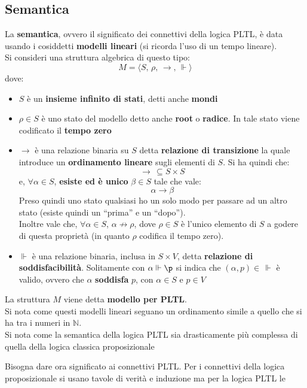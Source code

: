\documentclass[a4paper,12pt, oneside]{book}
\begin{document}
\subsection{Semantica}
\begin{definizione}
  La \textbf{semantica}, ovvero il significato dei connettivi della logica PLTL,
  è data usando i cosiddetti \textbf{modelli lineari} (si ricorda l'uso di un
  tempo lineare).\\
  Si consideri una struttura algebrica di questo tipo:
  \[M=\langle S,\,\rho, \,\to, \,\Vdash\rangle\]
  dove:
  \begin{itemize}
    \item $S$ è un \textbf{insieme infinito di stati}, detti anche
    \textbf{mondi}
    \item $\rho \in S$ è uno stato del modello detto anche \textbf{root} o
    \textbf{radice}. In tale stato viene codificato il \textbf{tempo zero}
    \item $\to$ è una relazione binaria su $S$ detta \textbf{relazione di
      transizione} la quale introduce un \textbf{ordinamento lineare} sugli
    elementi di $S$. Si ha quindi che:
    \[\to\,\subseteq S\times S\]
    e, $\forall \alpha \in S$, \textbf{esiste ed è unico} $\beta\in S$ tale che
    vale:
    \[\alpha\to\beta\]
    Preso quindi uno stato qualsiasi ho un solo modo per passare ad un altro
    stato (esiste quindi un ``prima'' e un ``dopo'').\\
    Inoltre vale che, $\forall \alpha\in S$, $\alpha\not\to \rho$, dove $\rho\in
    S$ è l'unico elemento di $S$ a godere di questa proprietà (in quanto $\rho$
    codifica il tempo zero). 
    \item $\Vdash$ è una relazione binaria, inclusa in $S\times V$, detta
    \textbf{relazione di soddisfacibilità}. Solitamente con $\alpha\Vdash\p$
    si indica che $(\alpha,p)\in\,\Vdash$ è valido, ovvero che $\alpha$
    \textbf{soddisfa} $p$, con $\alpha\in S$ e $p\in V$
  \end{itemize}
  La struttura $M$ viene detta \textbf{modello per PLTL}.\\
  Si nota come questi modelli lineari seguano un ordinamento simile a quello che
  si ha tra i numeri in $\mathbb{N}$.\\ 
  Si nota come la semantica della logica PLTL sia drasticamente più complessa
  di quella della logica classica proposizionale 
\end{definizione}
\newpage
Bisogna dare ora significato ai connettivi PLTL. Per i connettivi della logica
proposizionale si usano tavole di verità e induzione ma per la logica PLTL le
\end{document}
